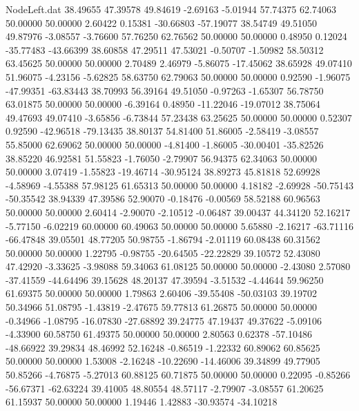 \begin{filecontents}{NodeLeft.dat}
  38.49655   47.39578   49.84619    -2.69163   -5.01944   57.74375   62.74063   50.00000   50.00000    2.60422    0.15381  -30.66803  -57.19077
  38.54749   49.51050   49.87976    -3.08557   -3.76600   57.76250   62.76562   50.00000   50.00000    0.48950    0.12024  -35.77483  -43.66399
  38.60858   47.29511   47.53021    -0.50707   -1.50982   58.50312   63.45625   50.00000   50.00000    2.70489    2.46979   -5.86075  -17.45062
  38.65928   49.07410   51.96075    -4.23156   -5.62825   58.63750   62.79063   50.00000   50.00000    0.92590   -1.96075  -47.99351  -63.83443
  38.70993   56.39164   49.51050    -0.97263   -1.65307   56.78750   63.01875   50.00000   50.00000   -6.39164    0.48950  -11.22046  -19.07012
  38.75064   49.47693   49.07410    -3.65856   -6.73844   57.23438   63.25625   50.00000   50.00000    0.52307    0.92590  -42.96518  -79.13435
  38.80137   54.81400   51.86005    -2.58419   -3.08557   55.85000   62.69062   50.00000   50.00000   -4.81400   -1.86005  -30.00401  -35.82526
  38.85220   46.92581   51.55823    -1.76050   -2.79907   56.94375   62.34063   50.00000   50.00000    3.07419   -1.55823  -19.46714  -30.95124
  38.89273   45.81818   52.69928    -4.58969   -4.55388   57.98125   61.65313   50.00000   50.00000    4.18182   -2.69928  -50.75143  -50.35542
  38.94339   47.39586   52.90070    -0.18476   -0.00569   58.52188   60.96563   50.00000   50.00000    2.60414   -2.90070   -2.10512   -0.06487
  39.00437   44.34120   52.16217    -5.77150   -6.02219   60.00000   60.49063   50.00000   50.00000    5.65880   -2.16217  -63.71116  -66.47848
  39.05501   48.77205   50.98755    -1.86794   -2.01119   60.08438   60.31562   50.00000   50.00000    1.22795   -0.98755  -20.64505  -22.22829
  39.10572   52.43080   47.42920    -3.33625   -3.98088   59.34063   61.08125   50.00000   50.00000   -2.43080    2.57080  -37.41559  -44.64496
  39.15628   48.20137   47.39594    -3.51532   -4.44644   59.96250   61.69375   50.00000   50.00000    1.79863    2.60406  -39.55408  -50.03103
  39.19702   50.34966   51.08795    -1.43819   -2.47675   59.77813   61.26875   50.00000   50.00000   -0.34966   -1.08795  -16.07830  -27.68892
  39.24775   47.19437   49.37622    -5.09106   -4.33900   60.58750   61.49375   50.00000   50.00000    2.80563    0.62378  -57.10486  -48.66922
  39.29834   48.46992   52.16248    -0.86519   -1.22332   60.89062   60.85625   50.00000   50.00000    1.53008   -2.16248  -10.22690  -14.46006
  39.34899   49.77905   50.85266    -4.76875   -5.27013   60.88125   60.71875   50.00000   50.00000    0.22095   -0.85266  -56.67371  -62.63224
  39.41005   48.80554   48.57117    -2.79907   -3.08557   61.20625   61.15937   50.00000   50.00000    1.19446    1.42883  -30.93574  -34.10218

\end{filecontents}
